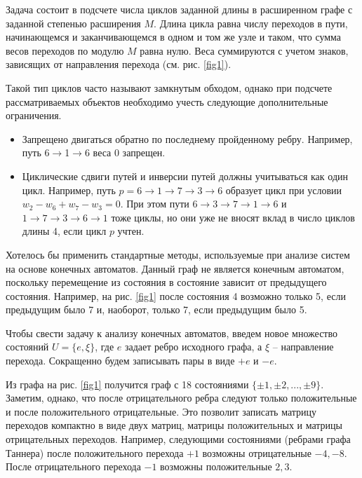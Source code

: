 \documentclass[specification,annotation,times]{itmo-student-thesis}
\begin{document}
Задача состоит в подсчете числа циклов заданной длины в расширенном 
графе с заданной степенью расширения $M$. Длина цикла равна числу переходов в 
пути, начинающемся и заканчивающемся  в одном и том же узле и таком, что 
сумма весов переходов по модулю $M$ равна нулю. 
Веса суммируются с учетом знаков, зависящих от направления 
перехода (см. рис. \ref{fig1}).

Такой тип циклов часто называют замкнутым обходом, однако при подсчете
рассматриваемых объектов необходимо учесть следующие дополнительные ограничения.
\begin{itemize}
\item
Запрещено двигаться обратно по последнему пройденному ребру. Например,
путь  6$\to$1$\to$6 веса 0 запрещен.
\item
Циклические сдвиги путей и инверсии путей должны  учитываться как один цикл. Например, путь
$p=6\to 1 \to 7\to 3 \to 6$  образует цикл при условии $w_2-w_6+w_7-w_3=0$. При этом пути
$6 \to 3 \to 7\to 1 \to 6$ и  $1\to 7 \to 3\to 6 \to 1$ тоже циклы, но они уже не вносят
вклад в число циклов длины 4,
если цикл $p$ учтен. 
\end{itemize}

Хотелось бы применить стандартные методы, используемые при анализе систем на основе 
конечных автоматов. Данный граф не является конечным автоматом, поскольку перемещение
из состояния в состояние зависит от предыдущего состояния.  Например, на рис. \ref{fig1}
после состояния 4 возможно только 5, если предыдущим было 7 и, наоборот,
только 7, если предыдущим было 5. 

Чтобы свести задачу к анализу конечных автоматов, введем новое множество состояний 
$U=\{e,\xi\}$, где  $e$ задает ребро исходного графа, а $\xi$ -- направление перехода. 
Сокращенно будем записывать пары в виде $+e$  и $-e$.   
 
Из графа на рис. \ref{fig1} получится  граф с 18 состояниями $\{ \pm 1, \pm 2,..., \pm 9\}$.
Заметим, однако, что после отрицательного  ребра следуют только положительные и после 
положительного отрицательные. Это позволит записать матрицу переходов компактно 
в виде двух матриц, матрицы положительных и матрицы отрицательных переходов.
Например, следующими состояниями (ребрами графа Таннера) после положительного перехода 
$+1$  возможны отрицательные $-4, -8$. После отрицательного перехода
$-1$  возможны положительные $2,3$. 
\end{document}
